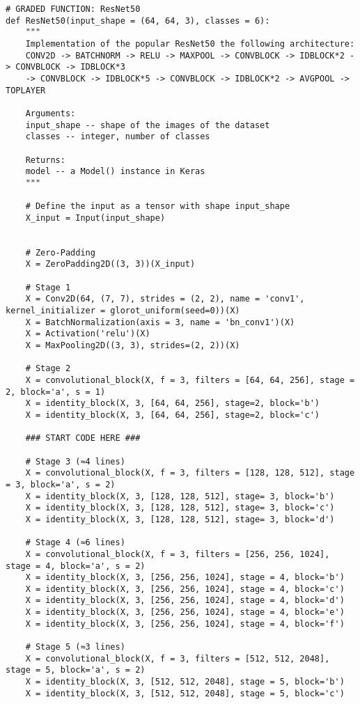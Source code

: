 \begin{verbatim}
# GRADED FUNCTION: ResNet50
def ResNet50(input_shape = (64, 64, 3), classes = 6):
    """
    Implementation of the popular ResNet50 the following architecture:
    CONV2D -> BATCHNORM -> RELU -> MAXPOOL -> CONVBLOCK -> IDBLOCK*2 -> CONVBLOCK -> IDBLOCK*3
    -> CONVBLOCK -> IDBLOCK*5 -> CONVBLOCK -> IDBLOCK*2 -> AVGPOOL -> TOPLAYER

    Arguments:
    input_shape -- shape of the images of the dataset
    classes -- integer, number of classes

    Returns:
    model -- a Model() instance in Keras
    """
    
    # Define the input as a tensor with shape input_shape
    X_input = Input(input_shape)

    
    # Zero-Padding
    X = ZeroPadding2D((3, 3))(X_input)
    
    # Stage 1
    X = Conv2D(64, (7, 7), strides = (2, 2), name = 'conv1', kernel_initializer = glorot_uniform(seed=0))(X)
    X = BatchNormalization(axis = 3, name = 'bn_conv1')(X)
    X = Activation('relu')(X)
    X = MaxPooling2D((3, 3), strides=(2, 2))(X)

    # Stage 2
    X = convolutional_block(X, f = 3, filters = [64, 64, 256], stage = 2, block='a', s = 1)
    X = identity_block(X, 3, [64, 64, 256], stage=2, block='b')
    X = identity_block(X, 3, [64, 64, 256], stage=2, block='c')

    ### START CODE HERE ###

    # Stage 3 (≈4 lines)
    X = convolutional_block(X, f = 3, filters = [128, 128, 512], stage = 3, block='a', s = 2)
    X = identity_block(X, 3, [128, 128, 512], stage= 3, block='b')
    X = identity_block(X, 3, [128, 128, 512], stage= 3, block='c')
    X = identity_block(X, 3, [128, 128, 512], stage= 3, block='d')

    # Stage 4 (≈6 lines)
    X = convolutional_block(X, f = 3, filters = [256, 256, 1024], stage = 4, block='a', s = 2)
    X = identity_block(X, 3, [256, 256, 1024], stage = 4, block='b')
    X = identity_block(X, 3, [256, 256, 1024], stage = 4, block='c')
    X = identity_block(X, 3, [256, 256, 1024], stage = 4, block='d')
    X = identity_block(X, 3, [256, 256, 1024], stage = 4, block='e')
    X = identity_block(X, 3, [256, 256, 1024], stage = 4, block='f')

    # Stage 5 (≈3 lines)
    X = convolutional_block(X, f = 3, filters = [512, 512, 2048], stage = 5, block='a', s = 2)
    X = identity_block(X, 3, [512, 512, 2048], stage = 5, block='b')
    X = identity_block(X, 3, [512, 512, 2048], stage = 5, block='c')


\end{verbatim}
